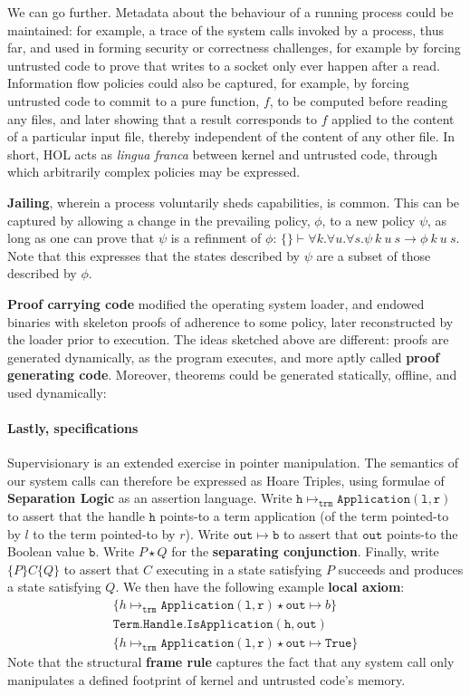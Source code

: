 \documentclass[sigplan, review]{acmart}
\newcommand{\deffont}[1]{\textbf{#1}}
\newcommand{\fall}[1]{\forall{#1}.}
\begin{document}
We can go further.
Metadata about the behaviour of a running process could be maintained: for example, a trace of the system calls invoked by a process, thus far, and used in forming security or correctness challenges, for example by forcing untrusted code to prove that writes to a socket only ever happen after a read.
Information flow policies could also be captured, for example, by forcing untrusted code to commit to a pure function, $f$, to be computed before reading any files, and later showing that a result corresponds to $f$ applied to the content of a particular input file, thereby independent of the content of any other file.
In short, HOL acts as \emph{lingua franca} between kernel and untrusted code, through which arbitrarily complex policies may be expressed.

\deffont{Jailing}, wherein a process voluntarily sheds capabilities, is common.
This can be captured by allowing a change in the prevailing policy, $\phi$, to a new policy $\psi$, as long as one can prove that $\psi$ is a refinment of $\phi$: $\{\} \vdash \fall{k}\fall{u}\fall{s} \psi\ k\ u\ s \longrightarrow \phi\ k\ u\ s$.
Note that this expresses that the states described by $\psi$ are a subset of those described by $\phi$.

\deffont{Proof carrying code} modified the operating system loader, and endowed binaries with skeleton proofs of adherence to some policy, later reconstructed by the loader prior to execution.
The ideas sketched above are different: proofs are generated dynamically, as the program executes, and more aptly called \deffont{proof generating code}.
Moreover, theorems could be generated statically, offline, and used dynamically:

\paragraph{Lastly, specifications}

Supervisionary is an extended exercise in pointer manipulation.
The semantics of our system calls can therefore be expressed as Hoare Triples, using formulae of \deffont{Separation Logic} as an assertion language.
Write $\mathtt{h} \mapsto_{\mathtt{trm}} \mathtt{Application(l, r)}$ to assert that the handle $\mathtt{h}$ points-to a term application (of the term pointed-to by $l$ to the term pointed-to by $r$).
Write $\mathtt{out} \mapsto \mathtt{b}$ to assert that $\mathtt{out}$ points-to the Boolean value $\mathtt{b}$.
Write $P \star Q$ for the \deffont{separating conjunction}.
Finally, write $\{ P \} C \{ Q \}$ to assert that $C$ executing in a state satisfying $P$ succeeds and produces a state satisfying $Q$.
We then have the following example \deffont{local axiom}:
\begin{gather*}
\{ h \mapsto_{\mathtt{trm}} \mathtt{Application(l, r)} \star \mathtt{out} \mapsto b \} \\
\mathtt{Term.Handle.IsApplication(h, out)} \\
\{ h \mapsto_{\mathtt{trm}} \mathtt{Application(l, r)} \star \mathtt{out} \mapsto \mathtt{True} \}
\end{gather*}
Note that the structural \deffont{frame rule} captures the fact that any system call only manipulates a defined footprint of kernel and untrusted code's memory.
\end{document}
